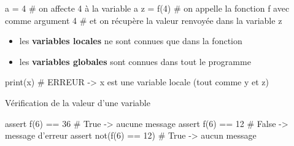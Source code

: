 	\begin{CodePythontexAlt}[TaillePolice=\normalsize, Largeur=1\linewidth,Centre,PremLigne=1, Lignes=true,]{}
			a = 4   		# on affecte 4 à la variable a
			z = f(4)		# on appelle la fonction f avec comme argument 4 
							# et on récupère la valeur renvoyée dans la variable z
		\end{CodePythontexAlt}

\begin{remarque}
	
	\begin{itemize}
		\item les \textbf{variables locales} ne sont connues que dans la fonction
		\item les \textbf{variables globales} sont connues dans tout le programme
	\end{itemize}

	\begin{CodePythontexAlt}[TaillePolice=\normalsize, Largeur=1\linewidth,Centre,PremLigne=1, Lignes=true,]{}
print(x)   # ERREUR -> x est une variable locale (tout comme y et z)
\end{CodePythontexAlt}

\end{remarque}



\begin{easybox}{Vérification de la valeur d'une variable}{}

	\begin{CodePythontexAlt}[TaillePolice=\normalsize, Largeur=1\linewidth,Centre,PremLigne=1, Lignes=true,]{}
assert f(6) == 36     	# True -> aucune message 
assert f(6) == 12     	# False -> message d'erreur 
assert not(f(6) == 12)	# True -> aucun message

\end{CodePythontexAlt}
\end{easybox}

